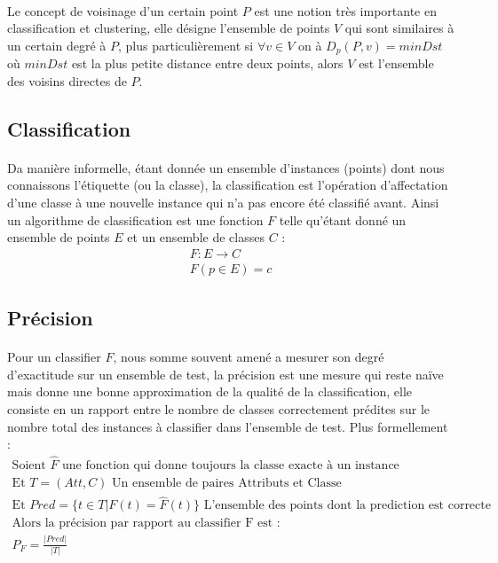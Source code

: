 			\paragraph{}
			Le concept de voisinage d'un certain point $P$ est une notion très importante en classification et clustering, elle désigne l'ensemble de points $V$ qui sont similaires à un certain degré à $P$, plus particulièrement si $\forall v \in V$ on à $D_p(P,v)=minDst$ où $minDst$ est la plus petite distance entre deux points, alors $V$ est l'ensemble des voisins directes de $P$.
		\subsection{Classification}
			\paragraph{}
			Da manière informelle, étant donnée un ensemble d'instances (points) dont nous connaissons l'étiquette (ou la classe), la classification est l'opération d'affectation d'une classe à une nouvelle instance qui n'a pas encore été classifié avant.
			Ainsi un algorithme de classification est une fonction $F$ telle qu'étant donné un ensemble de points $E$ et un ensemble de classes $C$ : 
			\begin{gather*}
				F : E \rightarrow C \\
				F(p \in E) = c 
			\end{gather*}
		\subsection{Précision}
			\paragraph{}
			Pour un classifier $F$, nous somme souvent amené a mesurer son degré d'exactitude sur un ensemble de test, la précision est une mesure qui reste naïve mais donne une bonne approximation de la qualité de la classification, elle consiste en un rapport entre le nombre de classes correctement prédites sur le nombre total des instances à classifier dans l'ensemble de test.
			Plus formellement : 
			\begin{gather*}
				\text{Soient } \hat{F} \text{  une fonction qui donne toujours la classe exacte à un instance} \\
				\text{Et } T={(Att,C)} \text{  Un ensemble de paires Attributs et Classe} \\
				\text{Et } Pred =\lbrace t \in T | F(t) = \hat{F}(t) \rbrace \text{  L'ensemble des points dont la prediction est correcte} \\
				\text{Alors la précision par rapport au classifier F est :  } \\
				P_F = \frac{|Pred|}{|T|}	
			\end{gather*}
